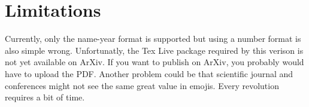 \documentclass{l3doc}
\begin{document}
\section{Limitations}

Currently, only the name-year format is supported but using a number format is also simple wrong.
Unfortunatly, the Tex Live package required by this verison is not yet available
on ArXiv. If you want to publish on ArXiv, you probably would have to upload the PDF.
Another problem could be that scientific journal and conferences might not see the same great value in emojis.
Every revolution requires a bit of time.




\end{document}

